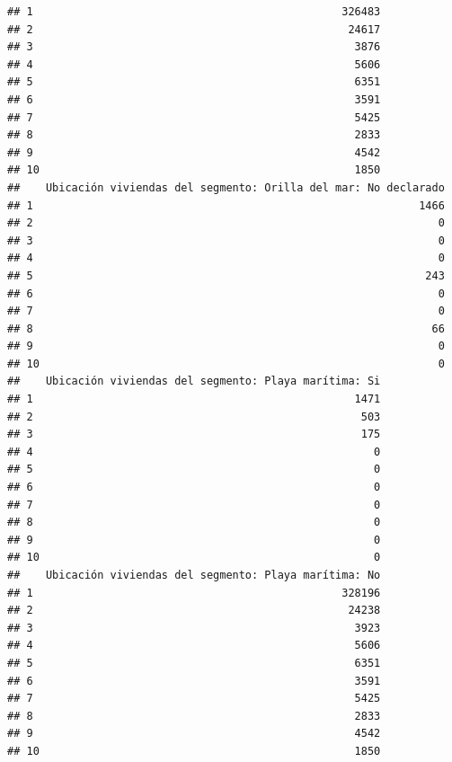 \documentclass[11pt,]{article}
\begin{document}
\begin{verbatim}
## 1                                                326483
## 2                                                 24617
## 3                                                  3876
## 4                                                  5606
## 5                                                  6351
## 6                                                  3591
## 7                                                  5425
## 8                                                  2833
## 9                                                  4542
## 10                                                 1850
##    Ubicación viviendas del segmento: Orilla del mar: No declarado
## 1                                                            1466
## 2                                                               0
## 3                                                               0
## 4                                                               0
## 5                                                             243
## 6                                                               0
## 7                                                               0
## 8                                                              66
## 9                                                               0
## 10                                                              0
##    Ubicación viviendas del segmento: Playa marítima: Si
## 1                                                  1471
## 2                                                   503
## 3                                                   175
## 4                                                     0
## 5                                                     0
## 6                                                     0
## 7                                                     0
## 8                                                     0
## 9                                                     0
## 10                                                    0
##    Ubicación viviendas del segmento: Playa marítima: No
## 1                                                328196
## 2                                                 24238
## 3                                                  3923
## 4                                                  5606
## 5                                                  6351
## 6                                                  3591
## 7                                                  5425
## 8                                                  2833
## 9                                                  4542
## 10                                                 1850

\end{verbatim}
\end{document}
